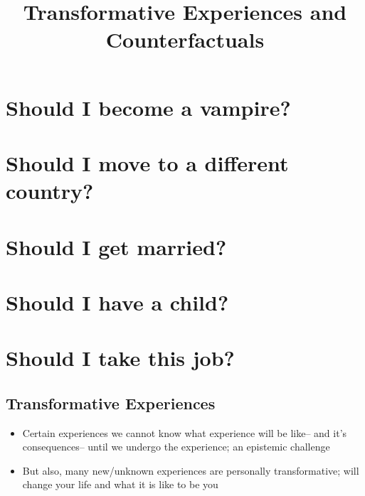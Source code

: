 \documentclass[
  .7em,
  letterpaper,
  DIV=11,
  numbers=noendperiod]{scrartcl}
\title{Transformative Experiences and Counterfactuals}
\author{}
\date{}
\begin{document}
\maketitle
\ifdefined\Shaded\renewenvironment{Shaded}{\begin{tcolorbox}[interior hidden, breakable, frame hidden, borderline west={3pt}{0pt}{shadecolor}, boxrule=0pt, sharp corners, enhanced]}{\end{tcolorbox}}\fi

\hypertarget{should-i-become-a-vampire}{%
\section{Should I become a vampire?}\label{should-i-become-a-vampire}}

\hypertarget{should-i-move-to-a-different-country}{%
\section{Should I move to a different
country?}\label{should-i-move-to-a-different-country}}

\hypertarget{should-i-get-married}{%
\section{Should I get married?}\label{should-i-get-married}}

\hypertarget{should-i-have-a-child}{%
\section{Should I have a child?}\label{should-i-have-a-child}}

\hypertarget{should-i-take-this-job}{%
\section{Should I take this job?}\label{should-i-take-this-job}}

\hypertarget{transformative-experiences}{%
\subsection{Transformative
Experiences}\label{transformative-experiences}}

\begin{itemize}
\item
  Certain experiences we cannot know what experience will be like-- and
  it's consequences-- until we undergo the experience; an epistemic
  challenge
\item
  But also, many new/unknown experiences are personally transformative;
  will change your life and what it is like to be you
\end{itemize}
\end{document}
